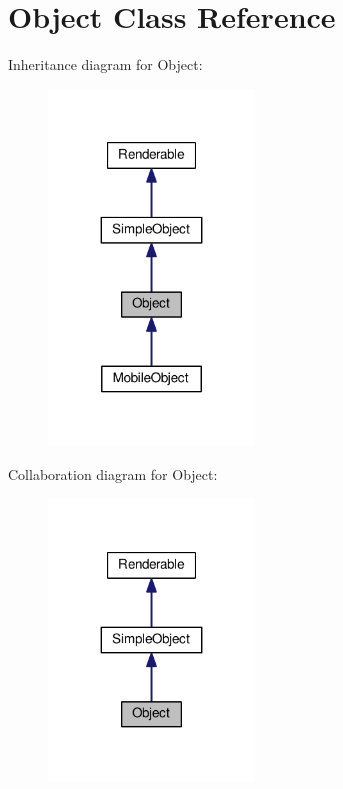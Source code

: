 \hypertarget{class_object}{}\section{Object Class Reference}
\label{class_object}


Inheritance diagram for Object\+:\nopagebreak
\begin{figure}[H]
\begin{center}
\leavevmode
\includegraphics[width=155pt]{class_object__inherit__graph}
\end{center}
\end{figure}


Collaboration diagram for Object\+:\nopagebreak
\begin{figure}[H]
\begin{center}
\leavevmode
\includegraphics[width=155pt]{class_object__coll__graph}
\end{center}
\end{figure}

